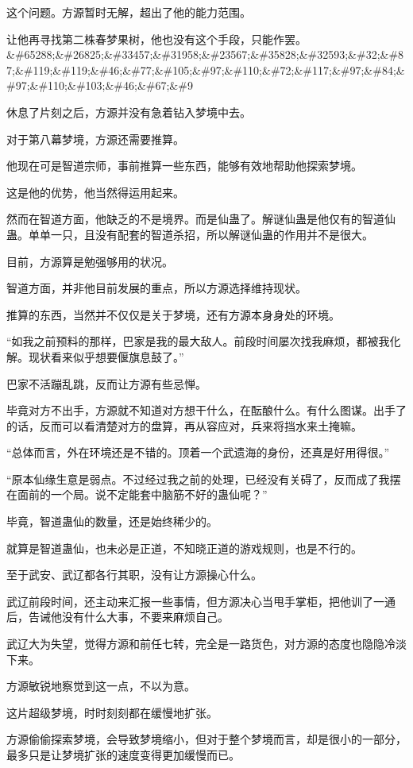 \begin{this_body}
这个问题。方源暂时无解，超出了他的能力范围。

让他再寻找第二株春梦果树，他也没有这个手段，只能作罢。\&\#65288;\&\#26825;\&\#33457;\&\#31958;\&\#23567;\&\#35828;\&\#32593;\&\#32;\&\#87;\&\#119;\&\#119;\&\#46;\&\#77;\&\#105;\&\#97;\&\#110;\&\#72;\&\#117;\&\#97;\&\#84;\&\#97;\&\#110;\&\#103;\&\#46;\&\#67;\&\#9

休息了片刻之后，方源并没有急着钻入梦境中去。

对于第八幕梦境，方源还需要推算。

他现在可是智道宗师，事前推算一些东西，能够有效地帮助他探索梦境。

这是他的优势，他当然得运用起来。

然而在智道方面，他缺乏的不是境界。而是仙蛊了。解谜仙蛊是他仅有的智道仙蛊。单单一只，且没有配套的智道杀招，所以解谜仙蛊的作用并不是很大。

目前，方源算是勉强够用的状况。

智道方面，并非他目前发展的重点，所以方源选择维持现状。

推算的东西，当然并不仅仅是关于梦境，还有方源本身身处的环境。

“如我之前预料的那样，巴家是我的最大敌人。前段时间屡次找我麻烦，都被我化解。现状看来似乎想要偃旗息鼓了。”

巴家不活蹦乱跳，反而让方源有些忌惮。

毕竟对方不出手，方源就不知道对方想干什么，在酝酿什么。有什么图谋。出手了的话，反而可以看清楚对方的盘算，再从容应对，兵来将挡水来土掩嘛。

“总体而言，外在环境还是不错的。顶着一个武遗海的身份，还真是好用得很。”

“原本仙缘生意是弱点。不过经过我之前的处理，已经没有关碍了，反而成了我摆在面前的一个局。说不定能套中脑筋不好的蛊仙呢？”

毕竟，智道蛊仙的数量，还是始终稀少的。

就算是智道蛊仙，也未必是正道，不知晓正道的游戏规则，也是不行的。

至于武安、武辽都各行其职，没有让方源操心什么。

武辽前段时间，还主动来汇报一些事情，但方源决心当甩手掌柜，把他训了一通后，告诫他没有什么大事，不要来麻烦自己。

武辽大为失望，觉得方源和前任七转，完全是一路货色，对方源的态度也隐隐冷淡下来。

方源敏锐地察觉到这一点，不以为意。

这片超级梦境，时时刻刻都在缓慢地扩张。

方源偷偷探索梦境，会导致梦境缩小，但对于整个梦境而言，却是很小的一部分，最多只是让梦境扩张的速度变得更加缓慢而已。


\end{this_body}
